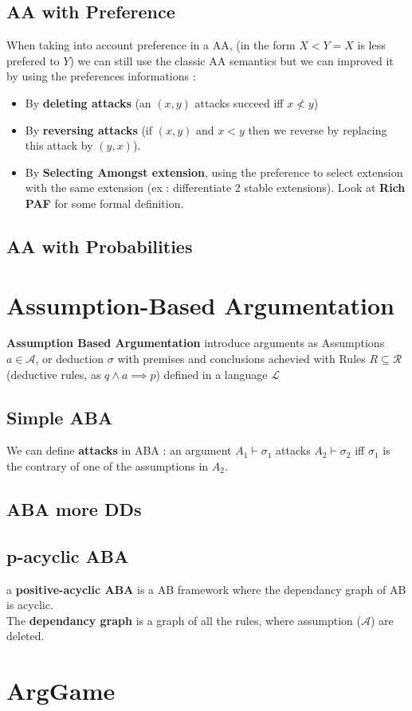 	\subsection{AA with Preference}
		When taking into account preference in a AA, (in the form $X < Y = X$ is less prefered to $Y$) we can still use the classic AA semantics but we can improved it by using the preferences informations :
		\begin{itemize}
			\item By \textbf{deleting attacks} (an $(x, y)$ attacks succeed iff $x \nless y$) 
			\item By \textbf{reversing attacks} (if $(x, y)$ and $x < y$ then we reverse by replacing this attack by $(y, x)$).
			\item By \textbf{Selecting Amongst extension}, using the preference to select extension with the same extension (ex : differentiate 2 stable extensions). Look at \textbf{Rich PAF} for some formal definition.
		\end{itemize}
	\subsection{AA with Probabilities}

\section{Assumption-Based Argumentation}
	
	\textbf{Assumption Based Argumentation} introduce arguments as Assumptions $a \in \mathcal{A}$, or deduction $\sigma$ with premises and conclusions achevied with Rules $R \subseteq \mathcal{R}$(deductive rules, as $q \wedge a \implies p$) defined in a language $\mathcal{L}$ 
	\subsection{Simple ABA}

		We can define \textbf{attacks} in ABA : an argument $A_1 \vdash \sigma_1$ attacks $A_2 \vdash \sigma_2$ iff $\sigma_1$ is the contrary of one of the assumptions in $A_2$.
	\subsection{ABA more DDs}
	\subsection{p-acyclic ABA}

		\begin{definition}
			a \textbf{positive-acyclic ABA} is a AB framework where the dependancy graph of AB is acyclic.\\
			The \textbf{dependancy graph} is a graph of all the rules, where assumption ($\mathcal{A}$) are deleted. 
		\end{definition}

\section{ArgGame}
